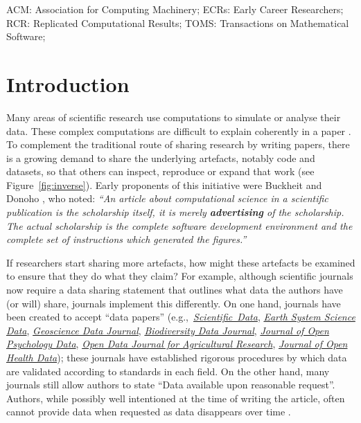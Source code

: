 \documentclass[12pt]{article}
\begin{document}
ACM: Association for Computing Machinery; 
ECRs: Early Career Researchers;
RCR: Replicated Computational Results;
TOMS: Transactions on Mathematical Software;
\clearpage

\section*{Introduction}\label{introduction}

Many areas of scientific research use computations to simulate or
analyse their data. These complex computations are difficult to
explain coherently in a paper \citep{marwick_how_2015}.  To complement
the traditional route of sharing research by writing papers, there is
a growing demand to share the underlying artefacts, notably code and
datasets, so that others can inspect, reproduce or expand that work
(see Figure~\ref{fig:inverse}).  Early proponents of this initiative
were Buckheit and Donoho
\cite{buckheit_wavelab_1995,claerbout_electronic_1992}, who noted:
\emph{``An article about computational science in a scientific
  publication is  the scholarship itself, it is merely
  \textbf{advertising} of the scholarship. The actual scholarship is
  the complete software development environment and the complete set
  of instructions which generated the figures.''}

If researchers start sharing more artefacts, how might these artefacts
be examined to ensure that they do what they claim?  For example,
although scientific journals now require a data sharing statement that
outlines what data the authors have (or will) share, journals
implement this differently.  On one hand, journals have
been created to accept ``data papers''
(e.g.,~\href{https://www.nature.com/sdata/}{\emph{Scientific~Data}},
\href{https://essd.copernicus.org/}{\emph{Earth System Science Data}},
\href{https://rmets.onlinelibrary.wiley.com/journal/20496060}{\emph{Geoscience
    Data Journal}}, \href{https://bdj.pensoft.net/}{\emph{Biodiversity
    Data Journal}},
\href{https://openpsychologydata.metajnl.com/}{\emph{Journal of Open
    Psychology Data}}, \href{https://odjar.org/}{\emph{Open Data
    Journal for Agricultural Research}},
\href{https://openhealthdata.metajnl.com}{\emph{Journal of Open Health
    Data}}); these journals have established rigorous procedures by
which data are validated according to standards in each field.  On
the other hand, many journals still allow authors to
state ``Data available upon reasonable request''.  Authors, while
possibly well intentioned at the time of writing the article, often
cannot provide data when requested as data disappears over time
\cite{Vines2014-hf}.
\end{document}
